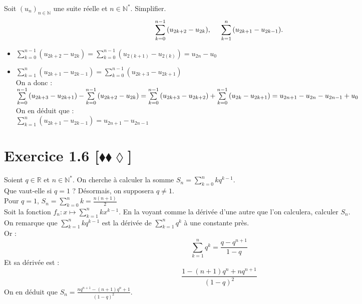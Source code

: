 \documentclass[10pt]{article}
\begin{document}
\begin{tcolorbox}[enhanced, width=7in, center, size=fbox, fontupper=\large, drop shadow southwest]
    Soit $(u_n)_{n\in\mathbb{N}}$ une suite réelle et $n\in\mathbb{N}^*$. Simplifier.
    \begin{equation*}
        \sum\limits^{n-1}_{k=0}{(u_{2k+2}-u_{2k})}, \hspace{0.5cm} \sum\limits^{n}_{k=1}{(u_{2k+1}-u_{2k-1})}.
    \end{equation*}
    \begin{itemize}
        \item $\sum\limits^{n-1}_{k=0}{(u_{2k+2}-u_{2k})}=\sum\limits^{n-1}_{k=0}{(u_{2(k+1)}-u_{2(k)})}=u_{2n}-u_0$
        \item $\sum\limits^{n}_{k=1}{(u_{2k+1}-u_{2k-1})}=\sum\limits^{n-1}_{k=0}{(u_{2k+3}-u_{2k+1})}$\\On a donc :\\$\sum\limits^{n-1}_{k=0}{(u_{2k+3}-u_{2k+1})}-\sum\limits^{n-1}_{k=0}{(u_{2k+2}-u_{2k})}\\=\sum\limits^{n-1}_{k=0}{(u_{2k+3}-u_{2k+2})} + \sum\limits^{n-1}_{k=0}{(u_{2k}-u_{2k+1})}\\=u_{2n+1}-u_{2n}-u_{2n-1}+u_{0}$\\On en déduit que :\\$\sum\limits^{n}_{k=1}{(u_{2k+1}-u_{2k-1})}=u_{2n+1}-u_{2n-1}$
    \end{itemize}
\end{tcolorbox}


\section*{Exercice 1.6 [$\blacklozenge\blacklozenge\lozenge$]}

\begin{tcolorbox}[enhanced, width=7in, center, size=fbox, fontupper=\large, drop shadow southwest]
    Soient $q\in\mathbb{R}$ et $n\in\mathbb{N}^*$. On cherche à calculer la somme $S_n=\sum\limits^{n}_{k=0}{kq^{k-1}}$.\\
    Que vaut-elle si $q=1$ ? Désormais, on supposera $q\neq 1$.\\
    Pour $q=1$, $S_n=\sum\limits^{n}_{k=0}{k}=\frac{n(n+1)}{2}$\\
    Soit la fonction $f_n:x\mapsto\sum\limits^{n}_{k=1}{kx^{k-1}}$. En la voyant comme la dérivée d'une autre que l'on calculera, calculer $S_n$.\\
    On remarque que $\sum\limits^{n}_{k=1}{kq^{k-1}}$ est la dérivée de $\sum\limits^{n}_{k=1}{q^k}$ à une constante près.\\
    Or :
    \begin{equation*}
        \sum\limits^{n}_{k=1}{q^k}=\frac{q-q^{n+1}}{1-q}
    \end{equation*}
    Et sa dérivée est :
    \begin{equation*}
        \frac{1-(n+1)q^n+nq^{n+1}}{(1-q)^2}
    \end{equation*}
    On en déduit que $S_n=\frac{nq^{n+1}-(n+1)q^n+1}{(1-q)^2}$.
\end{tcolorbox}
\end{document}
